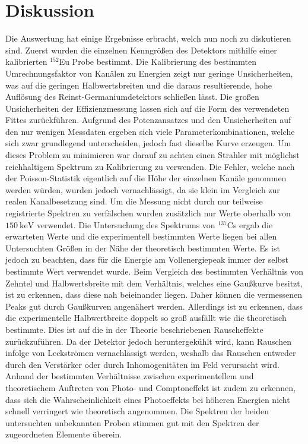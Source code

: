 
\section{Diskussion}
\label{sec:Diskussion}
Die Auswertung hat einige Ergebnisse erbracht, welch nun noch zu diskutieren sind. Zuerst wurden die einzelnen Kenngrößen des Detektors mithilfe einer kalibrierten $^{152}$Eu Probe bestimmt. Die Kalibrierung des bestimmten Umrechnungsfaktor von Kanälen zu Energien zeigt nur geringe Unsicherheiten, was auf die geringen Halbwertsbreiten und die daraus resultierende, hohe Auflösung des Reinst-Germaniumdetektors schließen lässt. Die großen Unsicherheiten der Effizienzmessung lassen sich auf die Form des verwendeten Fittes zurückführen. Aufgrund des Potenzansatzes und den Unsicherheiten auf den nur wenigen Messdaten ergeben sich viele Parameterkombinationen, welche sich zwar grundlegend unterscheiden, jedoch fast dieselbe Kurve erzeugen. Um dieses Problem zu minimieren war darauf zu achten einen Strahler mit möglichst reichhaltigem Spektrum zu Kalibrierung zu verwenden. Die Fehler, welche nach der Poisson-Statistik eigentlich auf die Höhe der einzelnen Kanäle genommen werden würden, wurden jedoch vernachlässigt, da sie klein im Vergleich zur realen Kanalbesetzung sind. Um die Messung nicht durch nur teilweise registrierte Spektren zu verfälschen wurden zusätzlich nur Werte oberhalb von $\SI{150}{\kilo\electronvolt}$ verwendet. Die Untersuchung des Spektrums von $^{137}$Cs ergab die erwarteten Werte und die experimentell bestimmten Werte liegen bei allen Untersuchten Größen in der Nähe der theoretisch bestimmten Werte. Es ist jedoch zu beachten, dass für die Energie am Vollenergiepeak immer der selbst bestimmte Wert verwendet wurde. Beim Vergleich des bestimmten Verhältnis von Zehntel und Halbwertsbreite mit dem Verhältnis, welches eine Gaußkurve besitzt, ist zu erkennen, dass diese nah beieinander liegen. Daher können die vermessenen Peaks gut durch Gaußkurven angenähert werden. Allerdings ist zu erkennen, dass die experimentelle Halbwertbreite doppelt so groß ausfällt wie die theoretisch bestimmte. Dies ist auf die in der Theorie beschriebenen Rauscheffekte zurückzuführen. Da der Detektor jedoch heruntergekühlt wird, kann Rauschen infolge von Leckströmen vernachlässigt werden, weshalb das Rauschen entweder durch den Verstärker oder durch Inhomogenitäten im Feld verursacht wird. Anhand der bestimmten Verhältnisse zwischen experimentellem und theoretischem Auftreten von Photo- und Comptoneffekt ist zudem zu erkennen, dass sich die Wahrscheinlichkeit eines Photoeffekts bei höheren Energien nicht schnell verringert wie theoretisch angenommen. 
Die Spektren der beiden untersuchten unbekannten Proben stimmen gut mit den Spektren der zugeordneten Elemente überein.